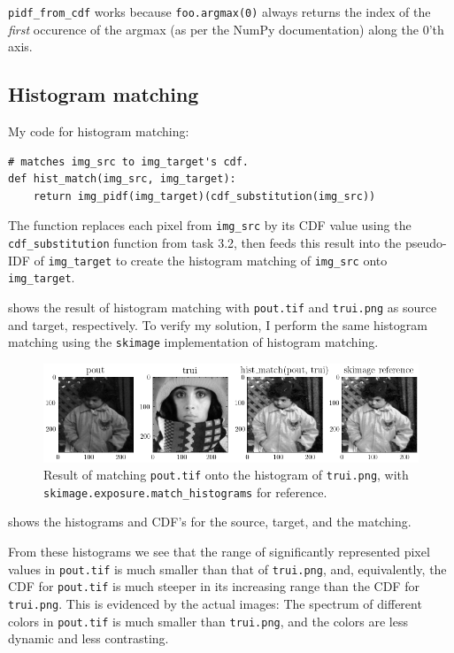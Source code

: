\texttt{pidf\_from\_cdf} works because \texttt{foo.argmax(0)} always returns the
index of the \textit{first} occurence of the argmax (as per the NumPy
documentation) along the 0'th axis. 


\subsection{Histogram matching}

My code for histogram matching:

\begin{verbatim}
# matches img_src to img_target's cdf.
def hist_match(img_src, img_target):
    return img_pidf(img_target)(cdf_substitution(img_src))
\end{verbatim}

The function replaces each pixel from \texttt{img\_src} by its CDF value using
the \texttt{cdf\_substitution} function from task 3.2, then feeds this result
into the pseudo-IDF of \texttt{img\_target} to create the histogram matching of
\texttt{img\_src} onto \texttt{img\_target}.

 shows the result of histogram matching with
\texttt{pout.tif} and \texttt{trui.png} as source and target, respectively. To
verify my solution, I perform the same histogram matching using the \texttt{skimage}
implementation of histogram matching.

\begin{figure}[H]
    \centering
    \includegraphics[width=\textwidth]{figures/task_3_4_matches.png}
    \caption{Result of matching \texttt{pout.tif} onto the histogram of
    \texttt{trui.png}, with \texttt{skimage.exposure.match\_histograms} for
    reference.}
    \label{fig:3.4.a}
\end{figure}


 shows the histograms and CDF's for the source, target, and the
matching.

From these histograms we see that the range of significantly represented pixel
values in \texttt{pout.tif} is much smaller than that of \texttt{trui.png}, and,
equivalently, the CDF for \texttt{pout.tif} is much steeper in its increasing
range than the CDF for \texttt{trui.png}. This is evidenced by the actual
images: The spectrum of different colors in \texttt{pout.tif} is much smaller
than \texttt{trui.png}, and the colors are less dynamic and less contrasting.

